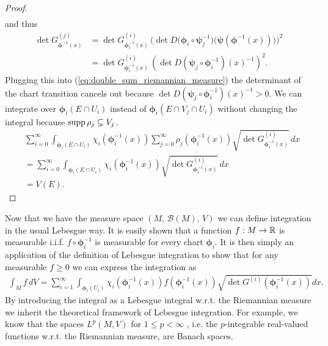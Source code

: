 \documentclass[../master_thesis.tex]{subfiles}
\begin{document}
\begin{proof}
\begin{align*}
    \end{align*}
    and thus 
    \begin{align*}
        \det G^{(j)}_{\boldsymbol{\phi}^{-1}(x)} 
        &= \det G^{(i)}_{\boldsymbol{\phi}_i^{-1}(x)} \,
            \bigg(\det D\big(\boldsymbol{\phi}_i \circ \boldsymbol{\psi}_j^{-1}\big)\big(\boldsymbol{\psi}(\boldsymbol{\phi}^{-1}(x))\big)\bigg)^2
        \\ &= \det G^{(i)}_{\boldsymbol{\phi}_i^{-1}(x)} \,
            \left( \det D(\boldsymbol{\psi}_j \circ \bm{\phi}_i^{-1})(x)^{-1}\right)^2.
    \end{align*}
    Plugging this into (\ref{eq:double_sum_riemannian_measure}) the determinant 
    of the chart transition cancels out because $\det D(\boldsymbol{\psi}_j \circ \boldsymbol{\phi}_i^{-1})(x)^{-1} > 0$.
    We can integrate over $\boldsymbol{\phi}_i(E \cap U_i)$ 
    instead of $\boldsymbol{\phi}_i(E \cap V_j \cap U_i)$ without changing the integral 
    because $\operatorname{supp} \rho_j \subseteq V_j$.
    \begin{align*}
        &\sum_{i=0}^\infty \int_{\boldsymbol{\phi}_i(E \cap U_i)} \chi_i(\boldsymbol{\phi}_i^{-1}(x))\sum_{j=0}^\infty \rho_j(\boldsymbol{\phi}_i^{-1}(x))
            \sqrt{\det G^{(i)}_{\boldsymbol{\phi}_i^{-1}(x)}} \, dx
        \\ &= \sum_{i=0}^\infty \int_{\boldsymbol{\phi}_i(E \cap U_i)} \chi_i(\boldsymbol{\phi}_i^{-1}(x))
             \sqrt{\det G^{(i)}_{\boldsymbol{\phi}_i^{-1}(x)}} \, dx
        \\ &= V(E).
    \end{align*}
\end{proof}


Now that we have the measure space $(M, \, \mathcal{B}(M), \, V)$
we can define integration in the usual Lebesgue way.
It is easily shown that a function $f: M \rightarrow \mathbb{R}$ is measurable 
i.i.f. $f \circ \boldsymbol{\phi}_i^{-1}$ is measurable for every chart $\boldsymbol{\phi}_i$. 
It is then simply an application of the definition of Lebesgue integration to
show that for any measurable $f \geq 0$ we can express the integration as
\begin{align*}
    \int_M f \, dV = \sum\limits_{i=1}^\infty \int_{\boldsymbol{\phi}_i(U_i)} 
        \chi_i(\boldsymbol{\phi}_i^{-1}(x)) f(\boldsymbol{\phi}_i^{-1}(x)) 
        \sqrt{\det G^{(i)}(\boldsymbol{\phi}_i^{-1}(x))} dx.
\end{align*}
By introducing the integral as a Lebesgue integral w.r.t. the Riemannian 
measure we inherit the theoretical framework of Lebesgue integration. 
For example, we know that the spaces $L^p(M,V)$ for $1\leq p < \infty$
, i.e. the $p$-integrable 
real-valued functions w.r.t. the Riemannian measure, are Banach spaces.
\end{document}

